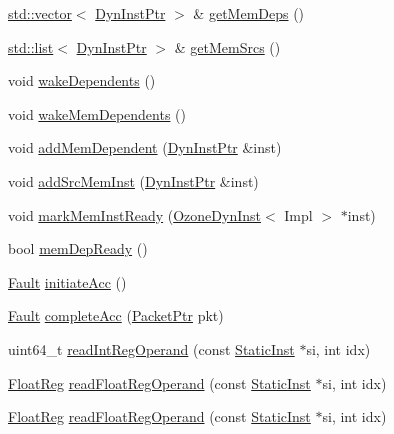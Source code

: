 \begin{DoxyCompactItemize}
\item 
\hyperlink{classstd_1_1vector}{std::vector}$<$ \hyperlink{classOzoneDynInst_a028ce10889c5f6450239d9e9a7347976}{DynInstPtr} $>$ \& \hyperlink{classOzoneDynInst_a912e35c4a6671a919053a95cce3e063a}{getMemDeps} ()
\item 
\hyperlink{classstd_1_1list}{std::list}$<$ \hyperlink{classOzoneDynInst_a028ce10889c5f6450239d9e9a7347976}{DynInstPtr} $>$ \& \hyperlink{classOzoneDynInst_aabdb1fb2845bfb247663b02f8d684c3e}{getMemSrcs} ()
\item 
void \hyperlink{classOzoneDynInst_a5e49f18c82c005142bde7623230b7257}{wakeDependents} ()
\item 
void \hyperlink{classOzoneDynInst_a841278536a46f85a1dd346c1d4f961e1}{wakeMemDependents} ()
\item 
void \hyperlink{classOzoneDynInst_a04ad69a873bec43dee7056f54e47ee11}{addMemDependent} (\hyperlink{classOzoneDynInst_a028ce10889c5f6450239d9e9a7347976}{DynInstPtr} \&inst)
\item 
void \hyperlink{classOzoneDynInst_a73d116dc8606002353b2b051be86e6fa}{addSrcMemInst} (\hyperlink{classOzoneDynInst_a028ce10889c5f6450239d9e9a7347976}{DynInstPtr} \&inst)
\item 
void \hyperlink{classOzoneDynInst_abf45d56d1eadb12109f0ade4f31ad1c4}{markMemInstReady} (\hyperlink{classOzoneDynInst}{OzoneDynInst}$<$ Impl $>$ $\ast$inst)
\item 
bool \hyperlink{classOzoneDynInst_a9edde0cc2b9486174b982c9dd8ff9a5c}{memDepReady} ()
\item 
\hyperlink{classRefCountingPtr}{Fault} \hyperlink{classOzoneDynInst_af8310f8618e710a06b0c2cbface6ac72}{initiateAcc} ()
\item 
\hyperlink{classRefCountingPtr}{Fault} \hyperlink{classOzoneDynInst_ae3a7c08c75c0a49df5adfb7d43996e12}{completeAcc} (\hyperlink{classPacket}{PacketPtr} pkt)
\item 
uint64\_\-t \hyperlink{classOzoneDynInst_a9e7b0a4d5373c48902425c9456b19e7e}{readIntRegOperand} (const \hyperlink{classStaticInst}{StaticInst} $\ast$si, int idx)
\item 
\hyperlink{classOzoneDynInst_a75484259f1855aabc8d74c6eb1cfe186}{FloatReg} \hyperlink{classOzoneDynInst_a717c88c8c56d79c9ed554ba5992bd8c3}{readFloatRegOperand} (const \hyperlink{classStaticInst}{StaticInst} $\ast$si, int idx)
\item 
\hyperlink{classOzoneDynInst_a75484259f1855aabc8d74c6eb1cfe186}{FloatReg} \hyperlink{classOzoneDynInst_a717c88c8c56d79c9ed554ba5992bd8c3}{readFloatRegOperand} (const \hyperlink{classStaticInst}{StaticInst} $\ast$si, int idx)

\end{DoxyCompactItemize}

